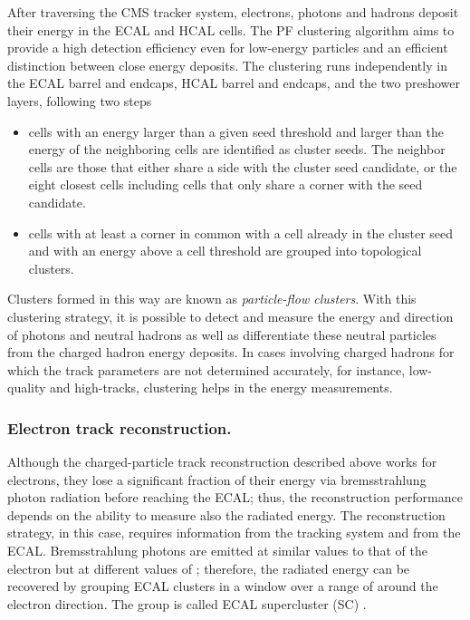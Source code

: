 After traversing the CMS tracker system, electrons, photons and hadrons deposit their energy in the ECAL and HCAL cells. The PF clustering algorithm aims to provide a high detection efficiency even for low-energy particles and an efficient distinction between close energy deposits. The clustering runs independently in the ECAL barrel and endcaps, HCAL barrel and endcaps, and the two preshower layers, following two steps
\begin{itemize}
\item cells with an energy larger than a given seed threshold and larger than the energy of the neighboring cells are identified as cluster seeds. The neighbor cells are those that either share a side with the cluster seed candidate, or the eight closest cells including cells that only share a corner with the seed candidate.
\item cells with at least a corner in common with a cell already in the cluster seed and with an energy above a cell threshold are grouped into topological clusters.
\end{itemize}

Clusters formed in this way are known as \textit{particle-flow clusters}. With this clustering strategy, it is possible to detect and measure the energy and direction of photons and neutral hadrons as well as differentiate these neutral particles from the charged hadron energy deposits. In cases involving charged hadrons for which the track parameters are not determined accurately, for instance, low-quality and high-\pt tracks, clustering helps in the energy measurements. 

\subsubsection*{Electron track reconstruction.}

Although the charged-particle track reconstruction described above works for electrons, they lose a significant fraction of their energy via bremsstrahlung photon radiation before reaching the ECAL; thus, the reconstruction performance depends on the ability to measure also the radiated energy. The reconstruction strategy, in this case, requires information from the tracking system and from the ECAL. Bremsstrahlung photons are emitted at similar \etac values to that of the electron but at different values of \phic; therefore, the radiated energy can be recovered by grouping ECAL clusters in a \etac window over a range of \phic around the electron direction. The group is called ECAL supercluster (SC) .

